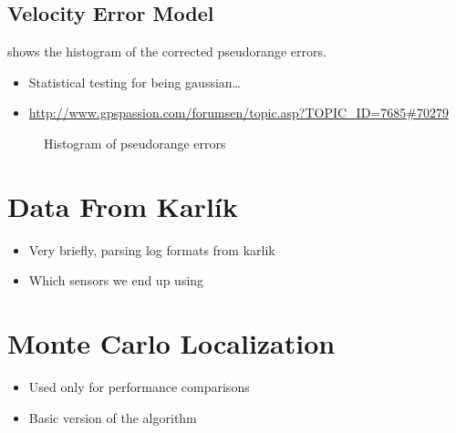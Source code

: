 \subsection{Velocity Error Model}
 shows the histogram of the corrected pseudorange
errors.
\begin{itemize}
\item Statistical testing for being gaussian\ldots
\item \url{http://www.gpspassion.com/forumsen/topic.asp?TOPIC_ID=7685#70279}
\end{itemize}

\begin{figure}[tp]
	\centering
	\caption{Histogram of pseudorange errors}
	\label{fig:impl-error-histogam}
\end{figure}

\section{Data From Karlík}
\begin{itemize}
\item Very briefly, parsing log formats from karlik
\item Which sensors we end up using
\end{itemize}

\section{Monte Carlo Localization}
\begin{itemize}
\item Used only for performance comparisons
\item Basic version of the algorithm
\end{itemize}
